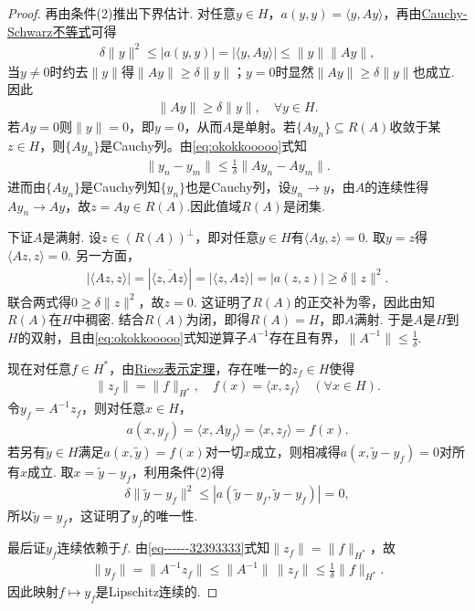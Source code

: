 \documentclass[../../main.tex]{subfiles}%
\begin{document}
\begin{proof}
再由条件(2)推出下界估计. 对任意$y\in H$，$a(y,y)=\langle y, Ay\rangle$，再由\hyperref[theorem:泛函分析--Cauchy-Schwarz不等式]{Cauchy-Schwarz不等式}可得
\begin{align*}
\delta\|y\|^2 \leqslant |a(y,y)| = |\langle y, Ay\rangle| \leqslant \|y\|\|Ay\|,
\end{align*}
当$y\neq 0$时约去$\|y\|$得$\|Ay\|\geqslant \delta\|y\|$；$y=0$时显然$\|Ay\|\geqslant \delta\|y\|$也成立. 因此
\begin{align}\label{eq:okokkooooo}
\|Ay\|\geqslant \delta\|y\|,\quad \forall y\in H.
\end{align}
若$Ay=0$则$\|y\|=0$，即$y=0$，从而$A$是单射。若$\{Ay_n\}\subseteq R(A)$收敛于某$z\in H$，则$\{Ay_n\}$是Cauchy列。由\eqref{eq:okokkooooo}式知
\begin{align*}
\|y_n-y_m\|\leqslant\frac{1}{\delta}\|Ay_n-Ay_m\|.
\end{align*}
进而由$\{Ay_n\}$是Cauchy列知$\{y_n\}$也是Cauchy列，设$y_n\to y$，由$A$的连续性得$Ay_n\to Ay$，故$z=Ay\in R(A)$.因此值域$R(A)$是闭集.

下证$A$是满射. 设$z\in(R(A))^\perp$，即对任意$y\in H$有$\langle Ay, z\rangle =0$. 取$y=z$得$\langle Az, z\rangle =0$. 另一方面，
\begin{align*}
|\langle Az, z\rangle| = |\overline{\langle z, Az\rangle}| = |\langle z, Az\rangle| = |a(z,z)| \geqslant \delta\|z\|^2.
\end{align*}
联合两式得$0\geqslant \delta\|z\|^2$，故$z=0$. 这证明了$R(A)$的正交补为零，因此由知$R(A)$在$H$中稠密. 结合$R(A)$为闭，即得$R(A)=H$，即$A$满射. 于是$A$是$H$到$H$的双射，且由\eqref{eq:okokkooooo}式知逆算子$A^{-1}$存在且有界，$\|A^{-1}\|\leqslant\frac{1}{\delta}$.

现在对任意$f\in H^*$，由\hyperref[theorem:Riesz表示定理(Hilbert空间)]{Riesz表示定理}，存在唯一的$z_f\in H$使得
\begin{align}\label{eq------32393333}
\|z_f\|=\|f\|_{H^*},\quad f(x)=\langle x, z_f\rangle \quad (\forall x\in H).
\end{align}
令$y_f = A^{-1}z_f$，则对任意$x\in H$，
\begin{align*}
a(x,y_f)=\langle x, Ay_f\rangle = \langle x, z_f\rangle = f(x).
\end{align*}
若另有$\widetilde{y}\in H$满足$a(x,\widetilde{y})=f(x)$对一切$x$成立，则相减得$a(x,\widetilde{y}-y_f)=0$对所有$x$成立. 取$x=\widetilde{y}-y_f$，利用条件(2)得
\begin{align*}
\delta\|\widetilde{y}-y_f\|^2 \leqslant |a(\widetilde{y}-y_f,\widetilde{y}-y_f)| = 0,
\end{align*}
所以$\widetilde{y}=y_f$，这证明了$y_f$的唯一性.

最后证$y_f$连续依赖于$f$. 由\eqref{eq------32393333}式知$\|z_f\|=\|f\|_{H^*}$，故
\begin{align*}
\|y_f\| = \|A^{-1}z_f\| \leqslant \|A^{-1}\|\,\|z_f\| \leqslant\frac{1}{\delta}\|f\|_{H^*}.
\end{align*}
因此映射$f\mapsto y_f$是Lipschitz连续的.
\end{proof}
\end{document}
